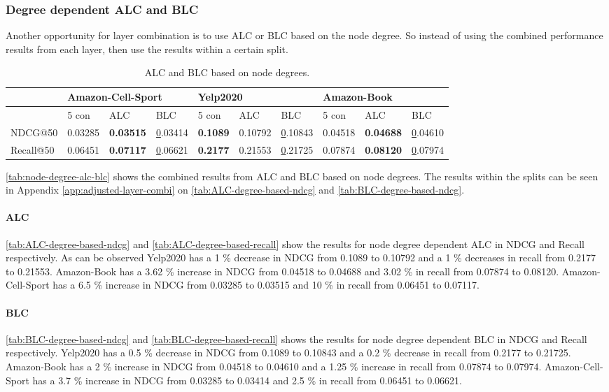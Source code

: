 \subsubsection{Degree dependent ALC and BLC}
Another opportunity for layer combination is to use ALC or BLC based on the node degree.
So instead of using the combined performance results from each layer, then use the results within a certain split.
\begin{table}[]
    \begin{tabular}{|l|l|l|l||l|l|l||l|l|l|}
    \hline
              & \multicolumn{3}{l||}{Amazon-Cell-Sport}     & \multicolumn{3}{l||}{Yelp2020}             & \multicolumn{3}{l|}{Amazon-Book}           \\ \hline
              & 5 con   & ALC              & BLC           & 5 con           & ALC     & BLC           & 5 con   & ALC              & BLC           \\ \hline
    NDCG@50   & 0.03285 & \textbf{0.03515} & {\ul 0.03414} & \textbf{0.1089} & 0.10792 & {\ul 0.10843} & 0.04518 & \textbf{0.04688} & {\ul 0.04610} \\ \hline
    Recall@50 & 0.06451 & \textbf{0.07117} & {\ul 0.06621} & \textbf{0.2177} & 0.21553 & {\ul 0.21725} & 0.07874 & \textbf{0.08120} & {\ul 0.07974} \\ \hline
    \end{tabular}
    \caption{ALC and BLC based on node degrees.}
    \label{tab:node-degree-alc-blc}
\end{table}
\autoref{tab:node-degree-alc-blc} shows the combined results from ALC and BLC based on node degrees.
The results within the splits can be seen in Appendix \autoref{app:adjusted-layer-combi} on \autoref{tab:ALC-degree-based-ndcg} and \autoref{tab:BLC-degree-based-ndcg}.
\paragraph{ALC}
\autoref{tab:ALC-degree-based-ndcg} and \autoref{tab:ALC-degree-based-recall} show the results for node degree dependent ALC in NDCG and Recall respectively. 
As can be observed Yelp2020 has a 1 \% decrease in NDCG from 0.1089 to 0.10792 and a 1 \% decreases in recall from 0.2177 to 0.21553.
Amazon-Book has a 3.62 \% increase in NDCG from 0.04518 to 0.04688 and 3.02 \% in recall from 0.07874 to 0.08120.
Amazon-Cell-Sport has a 6.5 \% increase in NDCG from 0.03285 to 0.03515 and 10 \% in recall from 0.06451 to 0.07117.
\paragraph{BLC}
\autoref{tab:BLC-degree-based-ndcg} and \autoref{tab:BLC-degree-based-recall} shows the results for node degree dependent BLC in NDCG and Recall respectively.
Yelp2020 has a 0.5 \%  decrease in NDCG from 0.1089 to 0.10843 and a 0.2 \% decrease in recall from 0.2177 to 0.21725.
Amazon-Book has a 2 \% increase in NDCG from 0.04518 to 0.04610 and a 1.25 \% increase in recall from 0.07874 to 0.07974. 
Amazon-Cell-Sport has a 3.7 \% increase in NDCG from 0.03285 to 0.03414 and 2.5 \% in recall from 0.06451 to 0.06621.
